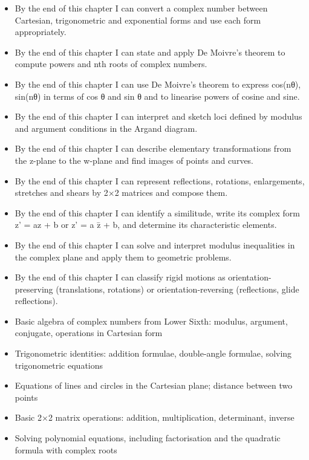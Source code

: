 \documentclass[11pt]{article}
\begin{document}
\begin{objectifs}
\begin{itemize}
\item By the end of this chapter I can convert a complex number between Cartesian, trigonometric and exponential forms and use each form appropriately.
\item By the end of this chapter I can state and apply De Moivre's theorem to compute powers and nth roots of complex numbers.
\item By the end of this chapter I can use De Moivre's theorem to express cos(nθ), sin(nθ) in terms of cos θ and sin θ and to linearise powers of cosine and sine.
\item By the end of this chapter I can interpret and sketch loci defined by modulus and argument conditions in the Argand diagram.
\item By the end of this chapter I can describe elementary transformations from the z-plane to the w-plane and find images of points and curves.
\item By the end of this chapter I can represent reflections, rotations, enlargements, stretches and shears by 2×2 matrices and compose them.
\item By the end of this chapter I can identify a similitude, write its complex form z' = az + b or z' = a z̄ + b, and determine its characteristic elements.
\item By the end of this chapter I can solve and interpret modulus inequalities in the complex plane and apply them to geometric problems.
\item By the end of this chapter I can classify rigid motions as orientation-preserving (translations, rotations) or orientation-reversing (reflections, glide reflections).
\end{itemize}
\end{objectifs}

\begin{prerequis}
\begin{itemize}
\item Basic algebra of complex numbers from Lower Sixth: modulus, argument, conjugate, operations in Cartesian form
\item Trigonometric identities: addition formulae, double-angle formulae, solving trigonometric equations
\item Equations of lines and circles in the Cartesian plane; distance between two points
\item Basic 2×2 matrix operations: addition, multiplication, determinant, inverse
\item Solving polynomial equations, including factorisation and the quadratic formula with complex roots
\end{itemize}
\end{prerequis}
\end{document}
